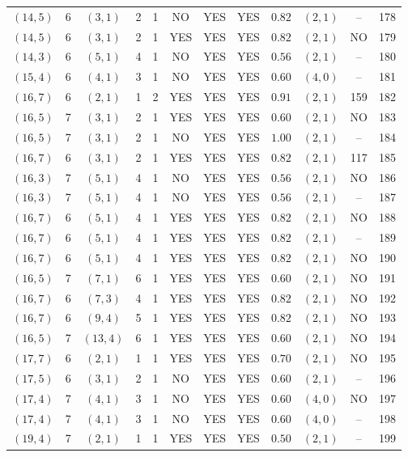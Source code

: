 \begin{longtable}{|c|c|c|c|c|c|c|c|c|c|c|c|}
$(14,5)$ & 6 & $(3,1)$ & 2 & 1 & NO & YES & YES & $0.82$ & $(2,1)$ & -- & 178\\
$(14,5)$ & 6 & $(3,1)$ & 2 & 1 & YES & YES & YES & $0.82$ & $(2,1)$ & NO & 179\\
$(14,3)$ & 6 & $(5,1)$ & 4 & 1 & NO & YES & YES & $0.56$ & $(2,1)$ & -- & 180\\
$(15,4)$ & 6 & $(4,1)$ & 3 & 1 & NO & YES & YES & $0.60$ & $(4,0)$ & -- & 181\\
$(16,7)$ & 6 & $(2,1)$ & 1 & 2 & YES & YES & YES & $0.91$ & $(2,1)$ & 159 & 182\\
$(16,5)$ & 7 & $(3,1)$ & 2 & 1 & YES & YES & YES & $0.60$ & $(2,1)$ & NO & 183\\
$(16,5)$ & 7 & $(3,1)$ & 2 & 1 & NO & YES & YES & $1.00$ & $(2,1)$ & -- & 184\\
$(16,7)$ & 6 & $(3,1)$ & 2 & 1 & YES & YES & YES & $0.82$ & $(2,1)$ & 117 & 185\\
$(16,3)$ & 7 & $(5,1)$ & 4 & 1 & NO & YES & YES & $0.56$ & $(2,1)$ & NO & 186\\
$(16,3)$ & 7 & $(5,1)$ & 4 & 1 & NO & YES & YES & $0.56$ & $(2,1)$ & -- & 187\\
$(16,7)$ & 6 & $(5,1)$ & 4 & 1 & YES & YES & YES & $0.82$ & $(2,1)$ & NO & 188\\
$(16,7)$ & 6 & $(5,1)$ & 4 & 1 & YES & YES & YES & $0.82$ & $(2,1)$ & -- & 189\\
$(16,7)$ & 6 & $(5,1)$ & 4 & 1 & YES & YES & YES & $0.82$ & $(2,1)$ & NO & 190\\
$(16,5)$ & 7 & $(7,1)$ & 6 & 1 & YES & YES & YES & $0.60$ & $(2,1)$ & NO & 191\\
$(16,7)$ & 6 & $(7,3)$ & 4 & 1 & YES & YES & YES & $0.82$ & $(2,1)$ & NO & 192\\
$(16,7)$ & 6 & $(9,4)$ & 5 & 1 & YES & YES & YES & $0.82$ & $(2,1)$ & NO & 193\\
$(16,5)$ & 7 & $(13,4)$ & 6 & 1 & YES & YES & YES & $0.60$ & $(2,1)$ & NO & 194\\
$(17,7)$ & 6 & $(2,1)$ & 1 & 1 & YES & YES & YES & $0.70$ & $(2,1)$ & NO & 195\\
$(17,5)$ & 6 & $(3,1)$ & 2 & 1 & NO & YES & YES & $0.60$ & $(2,1)$ & -- & 196\\
$(17,4)$ & 7 & $(4,1)$ & 3 & 1 & NO & YES & YES & $0.60$ & $(4,0)$ & NO & 197\\
$(17,4)$ & 7 & $(4,1)$ & 3 & 1 & NO & YES & YES & $0.60$ & $(4,0)$ & -- & 198\\
$(19,4)$ & 7 & $(2,1)$ & 1 & 1 & YES & YES & YES & $0.50$ & $(2,1)$ & -- & 199\\

\end{longtable}

